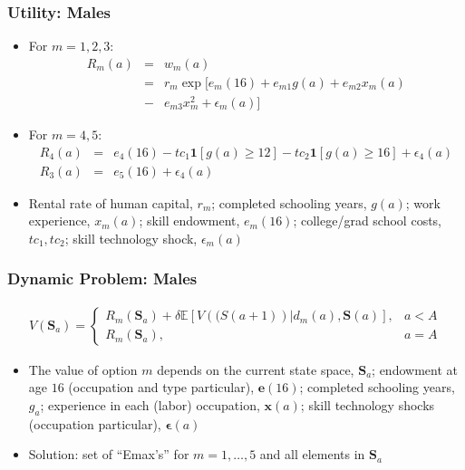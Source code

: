 \begin{frame}
	\frametitle{Utility: Males}
	\begin{itemize}
		\item For $m = 1, 2, 3$:
		\begin{eqnarray}
			R_{m}(a) &=& w_{m}(a) \nonumber \\
			         &=& r_{m} \exp [ e_{m}(16) + e_{m1}g(a) + e_{m2}x_{m}(a) \nonumber \\ 
			         &-& e_{m3}x_{m}^2 + \epsilon_{m}(a) ] \nonumber
		\end{eqnarray}
		\item For $m = 4, 5$:
		\begin{eqnarray}
			R_{4}(a) &=& e_{4}(16) - tc_{1} \mathbf{1} [g(a) \geq 12] - tc_{2} \mathbf{1} [g(a) \geq 16] + \epsilon_{4}(a) \nonumber \\
			R_{3}(a) &=& e_{5}(16) + \epsilon_{4}(a) \nonumber
		\end{eqnarray}
		\item Rental rate of human capital, $r_{m}$; completed schooling years, $g(a)$; work experience, $x_{m}(a)$; skill endowment, $e_{m}(16)$; college/grad school costs, $tc_{1},tc_{2}$; skill technology shock, $\epsilon_{m}(a)$
	\end{itemize}
\end{frame}

\begin{frame}
	\frametitle{Dynamic Problem: Males}
	\begin{eqnarray}
	V(\mathbf{S}_{a}) =
		\begin{cases}
			R_{m} (\mathbf{S}_{a}) + \delta \mathbb{E} \left[ V (\mathbf(S(a+1)) | d_{m}(a), \mathbf{S}(a) \right], & a < A \nonumber \\
			R_{m} (\mathbf{S}_{a}) \nonumber, & a = A
		\end{cases}
	\end{eqnarray}
	\begin{itemize}
		\item The value of option $m$ depends on the current state space, $\mathbf{S}_a$; endowment at age $16$ (occupation and type particular), $\mathbf{e}(16)$; completed schooling years, $g_{a}$; experience in each (labor) occupation, $\mathbf{x}(a)$; skill technology shocks (occupation particular), $\mathbf{\epsilon}(a)$
		\item Solution: set of ``Emax's'' for $m = 1, \ldots, 5$ and all elements in $\mathbf{S}_a$
	\end{itemize}
\end{frame}

